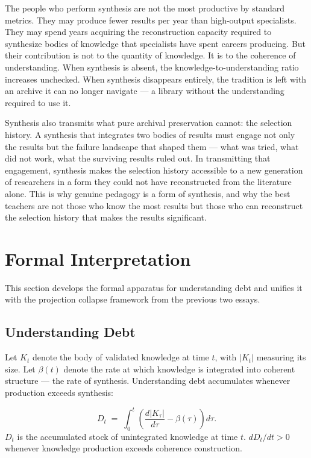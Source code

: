 The people who perform synthesis are not the most productive by standard
metrics. They may produce fewer results per year than high-output specialists.
They may spend years acquiring the reconstruction capacity required to synthesize
bodies of knowledge that specialists have spent careers producing. But their
contribution is not to the quantity of knowledge. It is to the coherence of
understanding. When synthesis is absent, the knowledge-to-understanding ratio
increases unchecked. When synthesis disappears entirely, the tradition is left
with an archive it can no longer navigate --- a library without the
understanding required to use it.

Synthesis also transmits what pure archival preservation cannot: the selection
history. A synthesis that integrates two bodies of results must engage not
only the results but the failure landscape that shaped them --- what was tried,
what did not work, what the surviving results ruled out. In transmitting that
engagement, synthesis makes the selection history accessible to a new generation
of researchers in a form they could not have reconstructed from the literature
alone. This is why genuine pedagogy is a form of synthesis, and why the best
teachers are not those who know the most results but those who can reconstruct
the selection history that makes the results significant.

\section{Formal Interpretation}

This section develops the formal apparatus for understanding debt and unifies
it with the projection collapse framework from the previous two essays.

\subsection*{Understanding Debt}

Let $K_t$ denote the body of validated knowledge at time $t$, with $|K_t|$
measuring its size. Let $\beta(t)$ denote the rate at which knowledge is
integrated into coherent structure --- the rate of synthesis. Understanding
debt accumulates whenever production exceeds synthesis:

\begin{defn}
\[
D_t \;=\; \int_0^t \left(\frac{d|K_\tau|}{d\tau} - \beta(\tau)\right) d\tau.
\]
$D_t$ is the accumulated stock of unintegrated knowledge at time $t$.
$dD_t/dt > 0$ whenever knowledge production exceeds coherence construction.
\end{defn}

